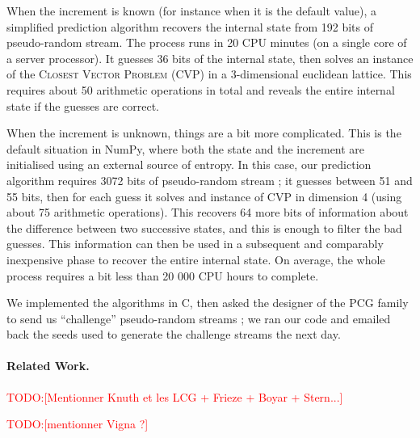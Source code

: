\documentclass[preprint,svgnames]{iacrtrans}
\newcommand{\todo}[1]{\textcolor{red}{TODO:[#1]}}
\begin{document}
When the increment is known (for instance when it is the default value), a
simplified prediction algorithm recovers the internal state from 192 bits of
pseudo-random stream. The process runs in 20 CPU minutes (on a single core of a
server processor). It guesses 36 bits of the internal state, then solves an
instance of the \textsc{Closest Vector Problem} (CVP) in a 3-dimensional
euclidean lattice. This requires about 50 arithmetic operations in total and
reveals the entire internal state if the guesses are correct.

When the increment is unknown, things are a bit more complicated. This is the
default situation in \textsf{NumPy}, where both the state and the increment are
initialised using an external source of entropy. In this case, our prediction
algorithm requires 3072 bits of pseudo-random stream ; it guesses between 51 and
55 bits, then for each guess it solves and instance of CVP in dimension 4 (using
about 75 arithmetic operations). This recovers 64 more bits of information about
the difference between two successive states, and this is enough to filter the
bad guesses. This information can then be used in a subsequent and comparably
inexpensive phase to recover the entire internal state. On average, the whole
process requires a bit less than 20 000 CPU hours to complete.

We implemented the algorithms in \textsf{C}, then asked the designer of the PCG
family to send us ``challenge'' pseudo-random streams ; we ran our code and
emailed back the seeds used to generate the challenge streams the next day.

\paragraph{Related Work.} \todo{Mentionner Knuth et les LCG + Frieze + Boyar + Stern...}

\todo{mentionner Vigna ?}


\end{document}
